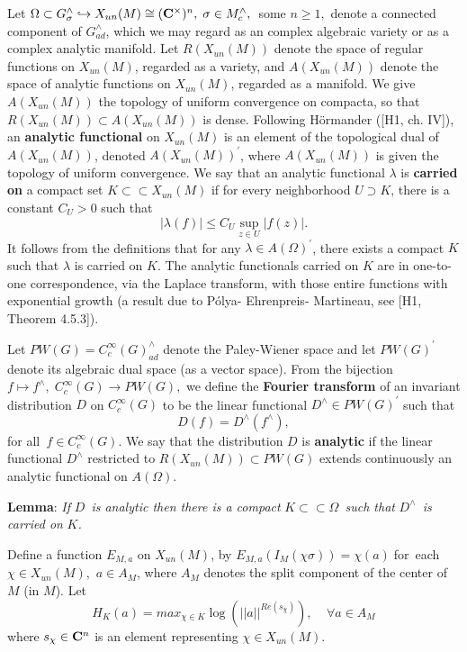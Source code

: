 Let $\Omega \subset G_\sigma ^{\wedge }\hookrightarrow X_{un}(M)\cong ({\bf C%
}^{\times })^n,\;\sigma \in M_c^{\wedge },\;$ some $n\geq 1,$ denote a
connected component of $G_{ad}^{\wedge }$, which we may regard as an complex
algebraic variety or as a complex analytic manifold. Let $R(X_{un}(M))$
denote the space of regular functions on $X_{un}(M)$, regarded as a variety,
and $A(X_{un}(M))$ denote the space of analytic functions on $X_{un}(M)$,
regarded as a manifold. We give $A(X_{un}(M))$ the topology of uniform
convergence on compacta, so that $R(X_{un}(M))\subset A(X_{un}(M))$ is
dense. Following H\"ormander ([H1, ch. IV]), an {\bf analytic functional} on 
$X_{un}(M)$ is an element of the topological dual of $A(X_{un}(M))$, denoted 
$A(X_{un}(M))^{\prime }$, where $A(X_{un}(M))$ is given the topology of
uniform convergence. We say that an analytic functional $\lambda $ is {\bf %
carried on} a compact set $K\subset \subset X_{un}(M)$ if for every
neighborhood $U\supset K$, there is a constant $C_U>0$ such that 
\[
|\lambda (f)|\leq C_U\sup _{z\in U}|f(z)|. 
\]
It follows from the definitions that for any $\lambda \in A(\Omega )^{\prime
}$, there exists a compact $K$ such that $\lambda $ is carried on $K$. The
analytic functionals carried on $K$ are in one-to-one correspondence, via
the Laplace transform, with those entire functions with exponential growth
(a result due to P\'olya- Ehrenpreis- Martineau, see [H1, Theorem 4.5.3]).

Let $PW(G)=C_c^\infty (G)_{ad}^{\wedge }$ denote the Paley-Wiener space and
let $PW(G)^{\prime }$ denote its algebraic dual space (as a vector space).
From the bijection $f\longmapsto f^{\wedge },\;C_c^\infty (G)\rightarrow
PW(G),$ we define the {\bf Fourier transform} of an invariant distribution $%
D $ on $C_c^\infty (G)$ to be the linear functional $D^{\wedge }\in
PW(G)^{\prime }$ such that 
\[
D(f)=D^{\wedge }(f^{\wedge }), 
\]
for all{\em \ }$f\in C_c^\infty (G).$ We say that the distribution $D$ is 
{\bf analytic} if the linear functional $D^{\wedge }$ restricted to $%
R(X_{un}(M))\subset PW(G)$ extends continuously an analytic functional on $%
A(\Omega )$.

{\bf Lemma}: {\em If }$D${\em \ is analytic then there is a compact }
$K\subset \subset \Omega ${\em \ such that }$D^{\wedge }${\em \ is carried on 
}$K${\em .}

Define a function $E_{M,a}$ on $X_{un}(M)$, by $E_{M,a}(I_M(\chi \sigma
))=\chi (a)\; $for\ each $\chi \in X_{un}(M),$ $a\in A_M$, where $A_M$
denotes the split component of the center of $M$ (in $M$). Let 
\[
H_K(a)=max_{\chi\in K}\log (||a||^{Re(s_\chi )}),\;\;\;\;\forall a\in A_M 
\]
where $s_\chi \in {\bf C}^n$ is an element representing $\chi \in X_{un}(M).$

